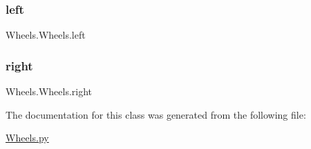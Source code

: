 \subsubsection{\texorpdfstring{left}{left}}
{\footnotesize\ttfamily Wheels.\+Wheels.\+left}

\mbox{\label{class_wheels_1_1_wheels_ac10912e5e2dc289a21f222787c4e0f98}} 
\subsubsection{\texorpdfstring{right}{right}}
{\footnotesize\ttfamily Wheels.\+Wheels.\+right}



The documentation for this class was generated from the following file\+:\begin{DoxyCompactItemize}
\item 
\mbox{\hyperlink{_wheels_8py}{Wheels.\+py}}\end{DoxyCompactItemize}
